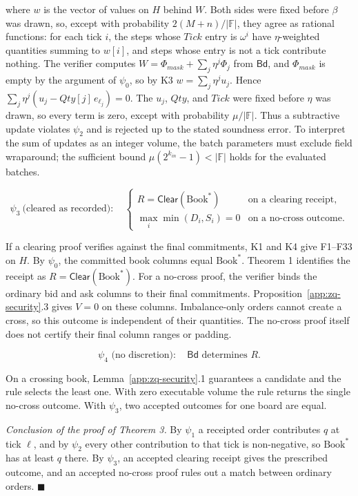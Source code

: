 where \(w\) is the vector of values on \(H\) behind \(W\). Both sides were fixed before \(\beta\) was drawn, so, except with probability \(2(M+n)/|\mathbb{F}|\), they agree as rational functions: for each tick \(i\), the steps whose \(Tick\) entry is \(\omega^i\) have \(\eta\)-weighted quantities summing to \(w[i]\), and steps whose entry is not a tick contribute nothing. The verifier computes \(W = \Phi_{mask} + \sum_j \eta^j \Phi_j\) from \(\mathsf{Bd}\), and \(\Phi_{mask}\) is empty by the argument of \(\psi_0\), so by K3 \(w = \sum_j \eta^j u_j\). Hence \(\sum_j \eta^j (u_j - Qty[j]\, e_{\ell_j}) = 0\). The \(u_j\), \(Qty\), and \(Tick\) were fixed before \(\eta\) was drawn, so every term is zero, except with probability \(\mu/|\mathbb{F}|\). Thus a subtractive update violates \(\psi_2\) and is rejected up to the stated soundness error. To interpret the sum of updates as an integer volume, the batch parameters must exclude field wraparound; the sufficient bound \(\mu(2^{k_{in}}-1)<|\mathbb F|\) holds for the evaluated batches.

\[
\psi_3\ \text{(cleared as recorded)}:\quad
\begin{cases}
 R=\mathsf{Clear}(\text{Book}^*) & \text{on a clearing receipt},\\
 \max_i\min(D_i,S_i)=0 & \text{on a no-cross outcome}.
\end{cases}
\]

If a clearing proof verifies against the final commitments, K1 and K4 give F1--F33 on \(H\). By \(\psi_0\), the committed book columns equal \(\text{Book}^*\). Theorem 1 identifies the receipt as \(R=\mathsf{Clear}(\text{Book}^*)\). For a no-cross proof, the verifier binds the ordinary bid and ask columns to their final commitments. Proposition~\ref{app:zq-security}.3 gives \(V=0\) on these columns. Imbalance-only orders cannot create a cross, so this outcome is independent of their quantities. The no-cross proof itself does not certify their final column ranges or padding.

\[\psi_4 \text{ (no discretion)}:\quad \mathsf{Bd} \text{ determines } R.\]

On a crossing book, Lemma~\ref{app:zq-security}.1 guarantees a candidate and the rule selects the least one. With zero executable volume the rule returns the single no-cross outcome. With \(\psi_3\), two accepted outcomes for one board are equal.

\emph{Conclusion of the proof of Theorem 3.} By \(\psi_1\) a receipted order contributes \(q\) at tick \(\ell\), and by \(\psi_2\) every other contribution to that tick is non-negative, so \(\text{Book}^*\) has at least \(q\) there. By \(\psi_3\), an accepted clearing receipt gives the prescribed outcome, and an accepted no-cross proof rules out a match between ordinary orders. \(\blacksquare\)

